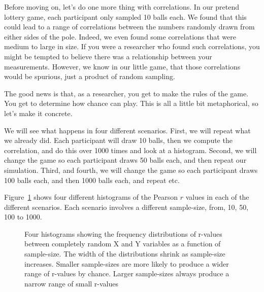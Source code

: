 \documentclass[
  letterpaper,
  DIV=11,
  numbers=noendperiod]{scrreprt}
\begin{document}
Before moving on, let's do one more thing with correlations. In our
pretend lottery game, each participant only sampled 10 balls each. We
found that this could lead to a range of correlations between the
numbers randomly drawn from either sides of the pole. Indeed, we even
found some correlations that were medium to large in size. If you were a
researcher who found such correlations, you might be tempted to believe
there was a relationship between your measurements. However, we know in
our little game, that those correlations would be spurious, just a
product of random sampling.

The good news is that, as a researcher, you get to make the rules of the
game. You get to determine how chance can play. This is all a little bit
metaphorical, so let's make it concrete.

We will see what happens in four different scenarios. First, we will
repeat what we already did. Each participant will draw 10 balls, then we
compute the correlation, and do this over 1000 times and look at a
histogram. Second, we will change the game so each participant draws 50
balls each, and then repeat our simulation. Third, and fourth, we will
change the game so each participant draws 100 balls each, and then 1000
balls each, and repeat etc.

Figure~\ref{fig-3corrandN} shows four different histograms of the
Pearson \(r\) values in each of the different scenarios. Each scenario
involves a different sample-size, from, 10, 50, 100 to 1000.

\begin{figure}


\caption{\label{fig-3corrandN}Four histograms showing the frequency
distributions of r-values between completely random X and Y variables as
a function of sample-size. The width of the distributions shrink as
sample-size increases. Smaller sample-sizes are more likely to produce a
wider range of r-values by chance. Larger sample-sizes always produce a
narrow range of small r-values}

\end{figure}%
\end{document}
